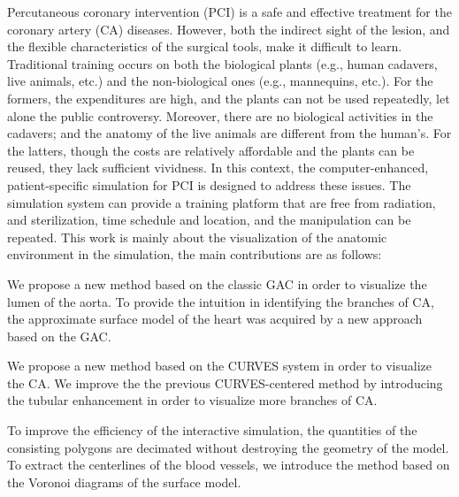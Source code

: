 
\begin{englishabstract}

Percutaneous coronary intervention (PCI) is a safe and effective treatment for the coronary artery (CA) diseases.
However, both the indirect sight of the lesion, and the flexible characteristics of the surgical tools, make it difficult to learn. 
Traditional training occurs on both the biological plants (e.g., human cadavers, live animals, etc.) and the non-biological ones (e.g., mannequins, etc.). 
For the formers, the expenditures are high, and the plants can not be used repeatedly, let alone the public controversy. 
Moreover, there are no biological activities in the cadavers; and the anatomy of the live animals are different from the human's.
For the latters, though the costs are relatively affordable and the plants can be reused, they lack sufficient vividness. 
In this context, the computer-enhanced, patient-specific simulation for PCI is designed to address these issues. 
The simulation system can provide a training platform that are free from radiation, and sterilization, time schedule and location, and the manipulation can be repeated. 
This work is mainly about the visualization of the anatomic environment in the simulation, the main contributions are as follows: 

We propose a new method based on the classic GAC in order to visualize the lumen of the aorta. 
To provide the intuition in identifying the branches of CA, the approximate surface model of the heart was acquired by a new approach based on the GAC. 

We propose a new method based on the CURVES system in order to visualize the CA. 
We improve the the previous CURVES-centered method by introducing the tubular enhancement in order to visualize more branches of CA.

To improve the efficiency of the interactive simulation, the quantities of the consisting polygons are decimated without destroying the geometry of the model.
To extract the centerlines of the blood vessels, we introduce the method based on the Voronoi diagrams of the surface model. 

%
\end{englishabstract}

